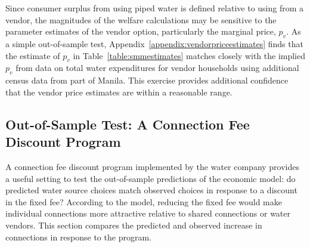 \documentclass[12pt]{article}
\begin{document}

Since consumer surplus from using piped water is defined relative to using from a vendor, the magnitudes of the welfare calculations may be sensitive to the parameter estimates of the vendor option, particularly the marginal price, $p_v$.  As a simple out-of-sample test, Appendix~\ref{appendix:vendorpriceestimates} finds that the estimate of $p_v$ in Table~\ref{table:smmestimates} matches closely with the implied $p_v$ from data on total water expenditures for vendor households using additional census data from part of Manila.  This exercise provides additional confidence that the vendor price estimates are within a reasonable range.



\subsection{Out-of-Sample Test: A Connection Fee Discount Program}\label{section:oostest}

A connection fee discount program implemented by the water company provides a useful setting to test the out-of-sample predictions of the economic model: do predicted water source choices match observed choices in response to a discount in the fixed fee?  According to the model, reducing the fixed fee would make individual connections more attractive relative to shared connections or water vendors.  This section compares the predicted and observed increase in connections in response to the program.  
\end{document}
